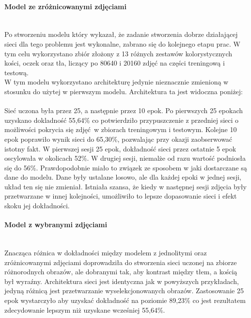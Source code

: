 \paragraph{Model ze zróżnicowanymi zdjęciami} \mbox{}\\
Po stworzeniu modelu który wykazał, że zadanie stworzenia dobrze działającej sieci dla
tego problemu jest wykonalne, zabrano się do kolejnego etapu prac. W tym celu
wykorzystano zbiór złożony z 13 różnych zestawów kolorystycznych kości, oczek oraz tła,
liczący po 80640 i 20160 zdjęć na części treningową i testową.\\
W tym modelu wykorzystano architekturę jedynie nieznacznie zmienioną w stosunku do
użytej w pierwszym modelu. Architektura ta jest widoczna poniżej: \\\\
Sieć uczona była przez 25, a następnie przez 10 epok.
Po pierwszych 25 epokach uzyskano dokladność 55,64\% co potwierdziło przypuszczenie
z przedniej sieci o możliwości pokrycia się zdjęć w zbiorach treningowym i testowym.
Kolejne 10 epok poprawiło wynik sieci do 65,30\%, pozwalając przy okazji zaobserwować
istotny fakt. W pierwszej sesji 25 epok, dokładność sieci przez ostatnie
5 epok oscylowała w okolicach 52\%. W drugiej sesji, niemalże od razu wartość
podniosła się do 56\%. Prawdopodobnie miało to związek ze sposobem w jaki dostarczane
są dane do modelu. Dane były ustalane losowo, ale dla każdej epoki w jednej sesji,
układ ten się nie zmieniał. Istniała szansa, że kiedy w następnej sesji zdjęcia
były przetwarzane w innej kolejności, umożliwiło to lepsze dopasowanie sieci i efekt
skoku jej dokładności.

\paragraph{Model z wybranymi zdjęciami} \mbox{}\\
Znacząca różnica w dokładności między modelem z jednolitymi oraz zróżnicowanymi zdjęciami
doprowadziła do stworzenia sieci uczonej na zbiorze różnorodnych obrazów, ale
dobranymi tak, aby kontrast między tłem, a kością był wyraźny. Architektura sieci
jest identyczna jak w powyższych przykładach, jedyną różnicą jest przetwarzanie
wyselekcjonowanych obrazów. Zastosowanie 25 epok wystarczyło aby uzyskać dokładność
na poziomie 89,23\% co jest rezultatem zdecydowanie lepszym niż uzyskane wcześniej 55,64\%.

